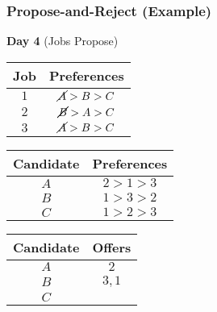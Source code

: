\documentclass{beamer}
\begin{document}
\begin{frame}
    \frametitle{Propose-and-Reject (Example)}
    {\bf Day 4} (Jobs Propose)
    \begin{center}
        \begin{tabular}{c|c}
            Job & Preferences \\
            \hline
            $1$ & $\cancel{A}>B>C$\\
            $2$ & $\cancel{B}>A>C$\\
            $3$ & $\cancel{A}>B>C$
        \end{tabular}
        \hspace{10pt}
        \begin{tabular}{c|c}
            Candidate & Preferences \\
            \hline
            $A$ & $2>1>3$\\
            $B$ & $1>3>2$\\
            $C$ & $1>2>3$
        \end{tabular}
    \end{center}
    \begin{center}
        \begin{tabular}{c|c}
            Candidate & Offers \\
            \hline
            $A$ & $2$ \\
            $B$ & $3,1$ \\
            $C$ & 
        \end{tabular}
    \end{center}
\end{frame}
\end{document}
